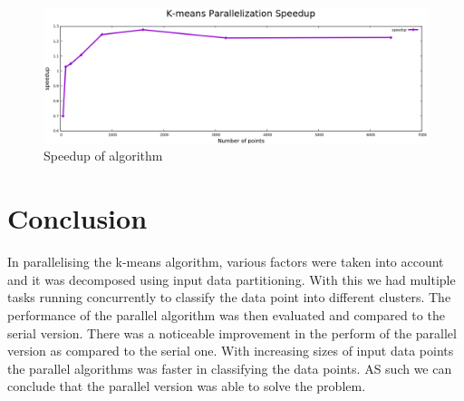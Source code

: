 \documentclass[12pt]{article}
\begin{document}
    		\begin{figure}
    			\begin{center}
    				\includegraphics[scale=0.4]{speedup.png}
    			\end{center}
    			\caption{Speedup of algorithm}
    		\end{figure}
    	
	\section{Conclusion}
    	\begin{flushleft}
			In parallelising the k-means algorithm, various factors were taken into account and it was decomposed using input data partitioning. With this we had multiple tasks running concurrently to classify the data point into different clusters. The performance of the parallel algorithm was then evaluated and compared to the serial version. There was a noticeable improvement in the perform of the parallel version as compared to the serial one. With increasing sizes of input data points the parallel algorithms was faster in classifying the data points. AS such we can conclude that the parallel version was able to solve the problem.
    	\end{flushleft}
\end{document}

